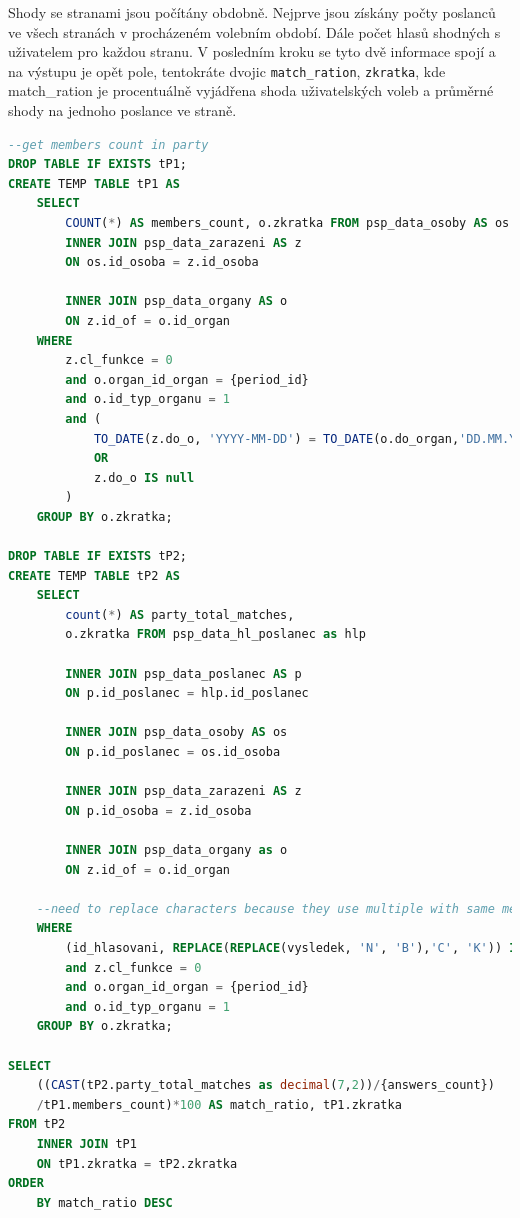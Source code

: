 \par Shody se stranami jsou počítány obdobně. Nejprve jsou získány počty poslanců ve všech stranách v procházeném volebním období. Dále počet hlasů shodných s uživatelem pro každou stranu. V posledním kroku se tyto dvě informace spojí a na výstupu je opět pole, tentokráte dvojic \texttt{match\_ration}, \texttt{zkratka}, kde match\_ration je procentuálně vyjádřena shoda uživatelských voleb a průměrné shody na jednoho poslance ve straně.

\begin{lstlisting}[language=SQL, caption={SQL dotaz na vyhledání shod uživatele se stranami}, label=code:sql-shoda-strany]
--get members count in party
DROP TABLE IF EXISTS tP1;
CREATE TEMP TABLE tP1 AS
    SELECT 
        COUNT(*) AS members_count, o.zkratka FROM psp_data_osoby AS os
        INNER JOIN psp_data_zarazeni AS z 
        ON os.id_osoba = z.id_osoba

        INNER JOIN psp_data_organy AS o
        ON z.id_of = o.id_organ
    WHERE 
        z.cl_funkce = 0
        and o.organ_id_organ = {period_id}
        and o.id_typ_organu = 1
        and (
            TO_DATE(z.do_o, 'YYYY-MM-DD') = TO_DATE(o.do_organ,'DD.MM.YYYY')
            OR 
            z.do_o IS null
        )
    GROUP BY o.zkratka;

DROP TABLE IF EXISTS tP2;
CREATE TEMP TABLE tP2 AS
    SELECT 
        count(*) AS party_total_matches, 
        o.zkratka FROM psp_data_hl_poslanec as hlp
        
        INNER JOIN psp_data_poslanec AS p
        ON p.id_poslanec = hlp.id_poslanec

        INNER JOIN psp_data_osoby AS os
        ON p.id_poslanec = os.id_osoba

        INNER JOIN psp_data_zarazeni AS z 
        ON p.id_osoba = z.id_osoba

        INNER JOIN psp_data_organy as o
        ON z.id_of = o.id_organ

    --need to replace characters because they use multiple with same meaning
    WHERE 
        (id_hlasovani, REPLACE(REPLACE(vysledek, 'N', 'B'),'C', 'K')) IN %s
        and z.cl_funkce = 0
        and o.organ_id_organ = {period_id}
        and o.id_typ_organu = 1
    GROUP BY o.zkratka;

SELECT 
    ((CAST(tP2.party_total_matches as decimal(7,2))/{answers_count})
    /tP1.members_count)*100 AS match_ratio, tP1.zkratka 
FROM tP2
    INNER JOIN tP1
    ON tP1.zkratka = tP2.zkratka
ORDER 
    BY match_ratio DESC
\end{lstlisting}


